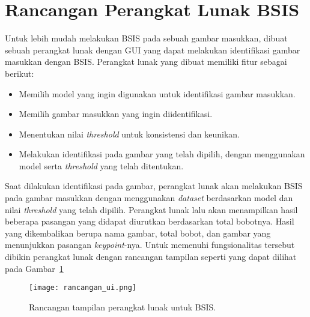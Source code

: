 \section{Rancangan Perangkat Lunak BSIS}
Untuk lebih mudah melakukan BSIS pada sebuah gambar masukkan, dibuat sebuah perangkat lunak dengan GUI yang dapat melakukan identifikasi gambar masukkan dengan BSIS. Perangkat lunak yang dibuat memiliki fitur sebagai berikut:
\begin{itemize}
	\item Memilih model yang ingin digunakan untuk identifikasi gambar masukkan.
	\item Memilih gambar masukkan yang ingin diidentifikasi.
	\item Menentukan nilai \textit{threshold} untuk konsistensi dan keunikan.
	\item Melakukan identifikasi pada gambar yang telah dipilih, dengan menggunakan model serta \textit{threshold} yang telah ditentukan.
\end{itemize}
Saat dilakukan identifikasi pada gambar, perangkat lunak akan melakukan BSIS pada gambar masukkan dengan menggunakan \textit{dataset} berdasarkan model dan nilai \textit{threshold} yang telah dipilih. Perangkat lunak lalu akan menampilkan hasil beberapa pasangan yang didapat diurutkan berdasarkan total bobotnya. Hasil yang dikembalikan berupa nama gambar, total bobot, dan gambar yang menunjukkan pasangan \textit{keypoint}-nya. Untuk memenuhi fungsionalitas tersebut dibikin perangkat lunak dengan rancangan tampilan seperti yang dapat dilihat pada Gambar~\ref{fig:rancangan_ui}
\begin{figure}[H]
	\centering
	\texttt{[image: rancangan\_ui.png]}
	\caption{Rancangan tampilan perangkat lunak untuk BSIS.}
	\label{fig:rancangan_ui}
\end{figure}

